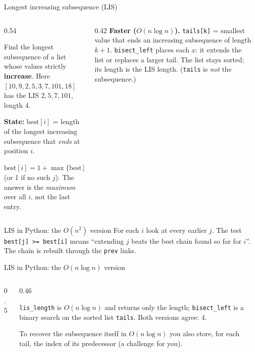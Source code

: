\documentclass[aspectratio=169,10pt]{beamer}
\newcommand{\figtab}[2][0.5]{\begin{sfig}[#1]\end{sfig}}
\begin{document}
\begin{frame}{Longest increasing subsequence (LIS)}
\begin{columns}[T]
\begin{column}{0.54\textwidth}
\figtab[0.3]{fig_lis}
\vspace{1mm}
{\small
Find the longest subsequence of a list whose values strictly \textbf{increase}. Here $[10,9,2,5,3,7,101,18]$ has the LIS $2,5,7,101$, length 4.

\vspace{1mm}
\textbf{State:} $\mathrm{best}[i]$ = length of the longest increasing subsequence that \emph{ends} at position $i$.

\vspace{1mm}
$\mathrm{best}[i]=1+\max\{\mathrm{best}[j]: j<i,\ a_j<a_i\}$ (or 1 if no such $j$). The answer is the \emph{maximum} over all $i$, not the last entry.}
\end{column}
\begin{column}{0.42\textwidth}
\vspace{1mm}
{\footnotesize
\textbf{Faster ($O(n\log n)$).} \texttt{tails[k]} = smallest value that ends an increasing subsequence of length $k+1$. \texttt{bisect\_left} places each $x$: it extends the list or replaces a larger tail. The list stays sorted; its length is the LIS length. (\texttt{tails} is \emph{not} the subsequence.)}
\end{column}
\end{columns}
\end{frame}

\begin{frame}{LIS in Python: the $O(n^2)$ version}
\pycode[\fontsize{7.8}{9.2}\selectfont]{lis_n2}
\vspace{1mm}
{\small
For each $i$ look at every earlier $j$. The test \texttt{best[j] >= best[i]} means ``extending $j$ beats the best chain found so far for $i$''. The chain is rebuilt through the \texttt{prev} links.}
\end{frame}

\begin{frame}{LIS in Python: the $O(n\log n)$ version}
\begin{columns}[T]
\begin{column}{0.5\textwidth}
\end{column}
\begin{column}{0.46\textwidth}
\vspace{2mm}
{\small
\texttt{lis\_length} is $O(n\log n)$ and returns only the length; \texttt{bisect\_left} is a binary search on the sorted list \texttt{tails}. Both versions agree: 4.

\vspace{2mm}
To recover the subsequence itself in $O(n\log n)$ you also store, for each tail, the index of its predecessor (a challenge for you).}
\end{column}
\end{columns}
\end{frame}
\end{document}
